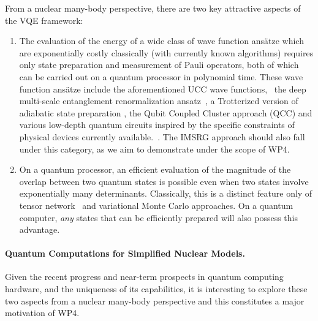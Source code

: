 \documentclass[11pt]{article}
\begin{document}
From a nuclear many-body perspective, there are 
two key attractive
aspects of the VQE framework: 
\begin{enumerate}
\item The evaluation of the energy of a wide class of wave function ans{\"a}tze which are
  exponentially costly classically (with currently known algorithms) requires only state preparation and measurement of Pauli operators, both of which can be carried out on a quantum processor in polynomial time. These
wave function ans{\"a}tze include the aforementioned UCC wave functions,~\cite{evangelista2011alternative, peruzzo2014variational} the deep multi-scale entanglement renormalization ansatz~\cite{kim2017robust}, a Trotterized version of adiabatic state preparation \cite{wecker2015progress}, the Qubit Coupled Cluster approach (QCC) \cite{ryabinkin2018qubit} and various low-depth quantum circuits inspired by the specific constraints of physical devices currently available.~\cite{kandala2017hardware}. The IMSRG approach should also fall under this category, as we aim to demonstrate under the scope of WP4. 

\item On a quantum processor, an efficient evaluation of the magnitude of the overlap between two
quantum states is possible even when two states involve exponentially many determinants. Classically, this is a distinct feature only of tensor network~\cite{stoudenmire2012studying} and variational Monte  Carlo \cite{RevModPhys.87.1067} approaches.
On a quantum computer, \emph{any} states that can be efficiently prepared will also possess this advantage.
\end{enumerate}

\paragraph{Quantum Computations for Simplified Nuclear Models.}
Given the recent progress and near-term prospects in quantum computing
hardware, and the uniqueness of its capabilities, it is interesting to explore these two aspects from a nuclear many-body perspective and this constitutes a major motivation of WP4.
\end{document}
